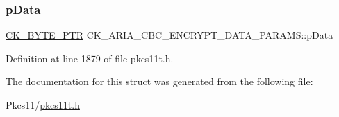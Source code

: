 \subsubsection{\texorpdfstring{p\+Data}{pData}}
{\footnotesize\ttfamily \hyperlink{pkcs11t_8h_a3d7233a4077fbaf7ae76b64da0a62a21}{C\+K\+\_\+\+B\+Y\+T\+E\+\_\+\+P\+TR} C\+K\+\_\+\+A\+R\+I\+A\+\_\+\+C\+B\+C\+\_\+\+E\+N\+C\+R\+Y\+P\+T\+\_\+\+D\+A\+T\+A\+\_\+\+P\+A\+R\+A\+M\+S\+::p\+Data}



Definition at line 1879 of file pkcs11t.\+h.



The documentation for this struct was generated from the following file\+:\begin{DoxyCompactItemize}
\item 
Pkcs11/\hyperlink{pkcs11t_8h}{pkcs11t.\+h}\end{DoxyCompactItemize}
